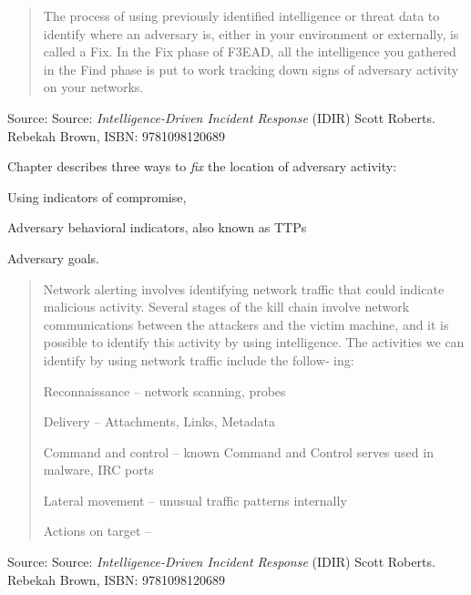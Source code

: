 \documentclass[Screen16to9,17pt]{foils}
\begin{document}







\begin{quote}
The process of using previously identified intelligence or threat data to identify where
an adversary is, either in your environment or externally, is called a Fix. In the Fix
phase of F3EAD, all the intelligence you gathered in the Find phase is put to work
tracking down signs of adversary activity on your networks.
\end{quote}
Source: Source: \emph{Intelligence-Driven Incident Response} (IDIR)
 Scott Roberts. Rebekah Brown, ISBN: 9781098120689

Chapter describes three ways to \emph{fix} the location of adversary activity:
\begin{list2}
\item Using indicators of compromise,
\item Adversary behavioral indicators, also known as TTPs
\item Adversary goals.
\end{list2}




\begin{quote}
Network alerting involves identifying network traffic that could indicate malicious
activity. Several stages of the kill chain involve network communications between the
attackers and the victim machine, and it is possible to identify this activity by using
intelligence. The activities we can identify by using network traffic include the follow‐
ing:
\begin{list2}
\item Reconnaissance -- network scanning, probes
\item Delivery -- Attachments, Links, Metadata
\item Command and control -- known Command and Control serves used in malware, IRC ports
\item Lateral movement -- unusual traffic patterns internally
\item Actions on target --
\end{list2}
\end{quote}
Source: Source: \emph{Intelligence-Driven Incident Response} (IDIR)
 Scott Roberts. Rebekah Brown, ISBN: 9781098120689
\end{document}
